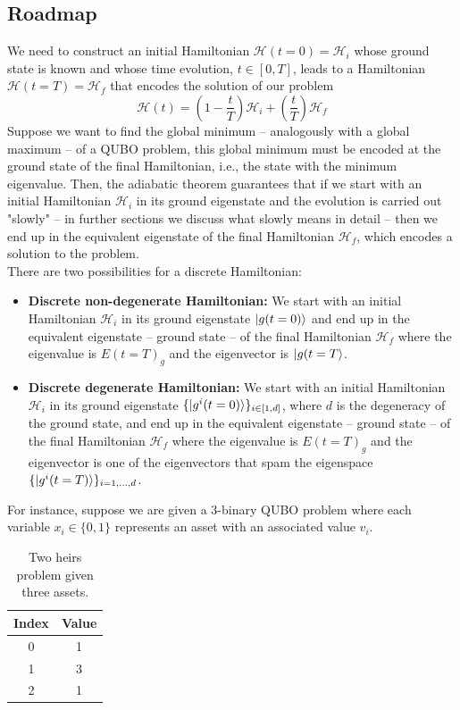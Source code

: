 \subsection{Roadmap}
We need to construct an initial Hamiltonian $\mathcal{H}(t=0) = \mathcal{H}_{i}$ whose ground state is known and whose time evolution, $t \in \left[0,T\right]$, leads to a Hamiltonian $\mathcal{H}(t=T) = \mathcal{H}_{f}$ that encodes the solution of our problem
\begin{equation}
\label{eq:Htime}
    \mathcal{H}(t) = \left(1-\frac{t}{T}\right)\mathcal{H}_{i} + \left(\frac{t}{T} \right)\mathcal{H}_{f}
\end{equation}
Suppose we want to find the global minimum -- analogously with a global maximum -- of a QUBO problem, this global minimum must be encoded at the ground state of the final Hamiltonian, i.e., the state with the minimum eigenvalue. Then, the adiabatic theorem guarantees that if we start with an initial Hamiltonian $\mathcal{H}_{i}$ in its ground eigenstate and the evolution is carried out "slowly" -- in further sections we discuss what slowly means in detail -- then we end up in the equivalent eigenstate of the final Hamiltonian $\mathcal{H}_{f}$, which encodes a solution to the problem.\\
There are two possibilities for a discrete Hamiltonian:
\begin{itemize}
    \item \textbf{Discrete non-degenerate Hamiltonian:} We start with an initial Hamiltonian $\mathcal{H}_{i}$ in its ground eigenstate $\ket{g(t=0)}$ and end up in the equivalent eigenstate -- ground state -- of the final Hamiltonian $\mathcal{H}_{f}$ where the eigenvalue is $E(t=T)_{g}$ and the eigenvector is $\ket{g(t=T}$.
    \item \textbf{Discrete degenerate Hamiltonian:} We start with an initial Hamiltonian $\mathcal{H}_{i}$ in its ground eigenstate $\{\ket{g^{i}(t=0)}\}_{i \in \left[1,d\right]}$, where $d$ is the degeneracy of the ground state, and end up in the equivalent eigenstate -- ground state -- of the final Hamiltonian $\mathcal{H}_{f}$ where the eigenvalue is $E(t=T)_{g}$ and the eigenvector is one of the eigenvectors that spam the eigenspace $\{\ket{g^{i}(t=T)}\}_{i = 1,..., d}$.
\end{itemize}
For instance, suppose we are given a 3-binary QUBO problem where each variable $x_{i} \in \{0,1\}$ represents an asset with an associated value $v_{i}$.
\begin{table}[h]
\label{tab:GroverSearch}
\centering
\begin{tabular}{ c | c }
  \hline			
  Index & Value  \\
    \hline		
   0 & 1\\
       \hline		
   1 & 3\\
       \hline		
   2 & 1
\end{tabular}
\caption{Two heirs problem given three assets.}
\end{table}
